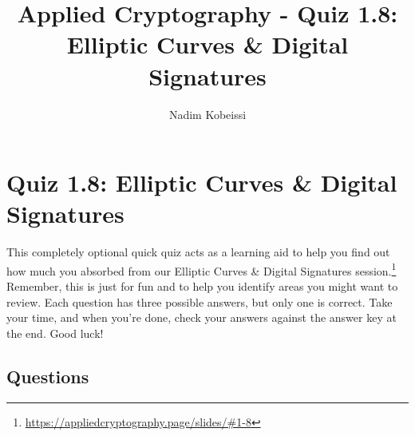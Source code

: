 \documentclass[10pt,a4paper,american]{exam}
\title{Applied Cryptography - Quiz 1.8: Elliptic Curves \& Digital Signatures}
\author{Nadim Kobeissi}
\begin{document}
\classhandoutheader
\section*{Quiz 1.8: Elliptic Curves \& Digital Signatures}

\begin{tcolorbox}[colframe=OliveGreen!30!white,colback=OliveGreen!5!white]
	This completely optional quick quiz acts as a learning aid to help you find out how much you absorbed from our Elliptic Curves \& Digital Signatures session.\footnote{\url{https://appliedcryptography.page/slides/\#1-8}} Remember, this is just for fun and to help you identify areas you might want to review. Each question has three possible answers, but only one is correct. Take your time, and when you're done, check your answers against the answer key at the end. Good luck!
\end{tcolorbox}

\subsection*{Questions}
\end{document}
